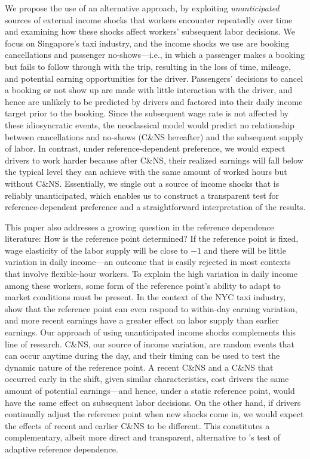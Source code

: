 \documentclass[reviewmode,AEJ]{AEA}
\begin{document}
We propose the use of an alternative approach, by exploiting \textit{unanticipated} sources of external 
income shocks that workers encounter repeatedly over time and examining how these shocks affect workers' 
subsequent labor decisions. We focus on Singapore's taxi industry, and the income shocks we use are 
booking cancellations and passenger no-shows---i.e., in which a passenger makes a booking but fails 
to follow through with the trip, resulting in the loss of time, mileage, and potential earning 
opportunities for the driver. Passengers' decisions to cancel a booking or not show up are made with 
little interaction with the driver, and hence are unlikely to be predicted by drivers and factored 
into their daily income target prior to the booking. Since the subsequent wage rate is not affected 
by these idiosyncratic events, the neoclassical model would predict no relationship between cancellations 
and no-shows (C\&NS hereafter) and the subsequent supply of labor. In contrast, under reference-dependent 
preference, we would expect drivers to work harder because after C\&NS, their realized earnings will fall 
below the typical level they can achieve with the same amount of worked hours but without C\&NS. 
Essentially, we single out a source of income shocks that is reliably unanticipated, which enables 
us to construct a transparent test for reference-dependent preference and a straightforward 
interpretation of the results.


This paper also addresses a growing question in the reference dependence literature: How is the 
reference point determined? If the reference point is fixed, wage elasticity of the labor supply will be
close to $-1$ and there will be little variation in daily income---an outcome that is easily rejected 
in most contexts that involve flexible-hour workers. To explain the high variation in daily income among 
these workers, some form of the reference point's ability to adapt to market conditions must be present. 
In the context of the NYC taxi industry, \citet{thakral2018daily} show that the reference point can even 
respond to within-day earning variation, and more recent earnings have a greater effect on labor supply 
than earlier earnings. Our approach of using unanticipated income shocks complements this line of research. 
C\&NS, our source of income variation, are random events that can occur anytime during the day, and their
timing can be used to test the dynamic nature of the reference point. A recent C\&NS and a C\&NS that 
occurred early in the shift, given similar characteristics, cost drivers the same amount of potential 
earnings---and hence, under a static reference point, would have the same effect on subsequent labor 
decisions. On the other hand, if drivers continually adjust the reference point when new shocks come in, 
we would expect the effects of recent and earlier C\&NS to be different. This constitutes a complementary, 
albeit more direct and transparent, alternative to  \citeauthor{thakral2018daily}'s test of adaptive 
reference dependence.
\end{document}
